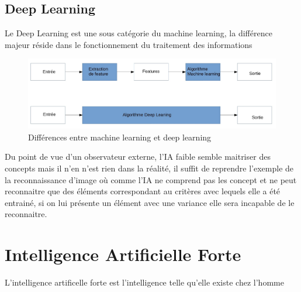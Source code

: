 \subsection{Deep Learning}
Le Deep Learning est une sous catégorie du machine learning, 
la différence majeur réside dans le fonctionnement du traitement des 
informations  

\begin{figure}[!h]
    \centering
    \includegraphics[width=1\textwidth]{Images/MLvsDL}
    \caption{Différences entre machine learning et deep learning}
	\label{fig:categorieIA}
\end{figure}


Du point de vue d'un observateur externe, l'IA faible
semble maitriser des concepts mais il n'en n'est rien dans la 
réalité, il suffit de reprendre l'exemple de la reconnaissance d'image
où comme l'IA ne comprend pas les concept et ne peut reconnaitre 
que des éléments correspondant au critères avec lequels elle a été 
entrainé, si on lui présente un élément avec une variance elle 
sera incapable de le reconnaitre.  
    
\section{Intelligence Artificielle Forte}
L'intelligence artificelle forte est l'intelligence
telle qu'elle existe chez l'homme




